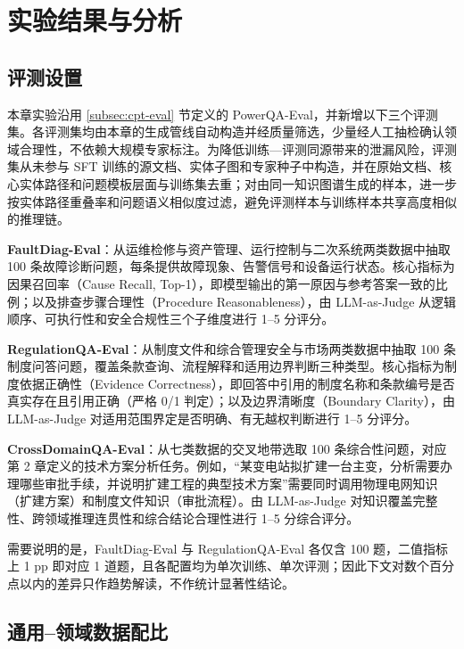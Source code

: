 \documentclass[fontset=fandol,type=master,campus=shenzhen,etitleauto=true]{hithesisbook}
\begin{document}
\section{实验结果与分析}\label{sft-ux8badux7ec3ux4e0eux5b9eux9a8cux7ed3ux679c}

\subsection{评测设置}\label{subsec:sft-eval}

本章实验沿用 \ref{subsec:cpt-eval} 节定义的 PowerQA-Eval，并新增以下三个评测集。各评测集均由本章的生成管线自动构造并经质量筛选，少量经人工抽检确认领域合理性，不依赖大规模专家标注。为降低训练—评测同源带来的泄漏风险，评测集从未参与 SFT 训练的源文档、实体子图和专家种子中构造，并在原始文档、核心实体路径和问题模板层面与训练集去重；对由同一知识图谱生成的样本，进一步按实体路径重叠率和问题语义相似度过滤，避免评测样本与训练样本共享高度相似的推理链。

\textbf{FaultDiag-Eval}：从运维检修与资产管理、运行控制与二次系统两类数据中抽取 100 条故障诊断问题，每条提供故障现象、告警信号和设备运行状态。核心指标为因果召回率（Cause Recall, Top-1），即模型输出的第一原因与参考答案一致的比例；以及排查步骤合理性（Procedure Reasonableness），由 LLM-as-Judge 从逻辑顺序、可执行性和安全合规性三个子维度进行 1--5 分评分。

\textbf{RegulationQA-Eval}：从制度文件和综合管理安全与市场两类数据中抽取 100 条制度问答问题，覆盖条款查询、流程解释和适用边界判断三种类型。核心指标为制度依据正确性（Evidence Correctness），即回答中引用的制度名称和条款编号是否真实存在且引用正确（严格 0/1 判定）；以及边界清晰度（Boundary Clarity），由 LLM-as-Judge 对适用范围界定是否明确、有无越权判断进行 1--5 分评分。

\textbf{CrossDomainQA-Eval}：从七类数据的交叉地带选取 100 条综合性问题，对应第 2 章定义的技术方案分析任务。例如，“某变电站拟扩建一台主变，分析需要办理哪些审批手续，并说明扩建工程的典型技术方案”需要同时调用物理电网知识（扩建方案）和制度文件知识（审批流程）。由 LLM-as-Judge 对知识覆盖完整性、跨领域推理连贯性和综合结论合理性进行 1--5 分综合评分。

需要说明的是，FaultDiag-Eval 与 RegulationQA-Eval 各仅含 100 题，二值指标上 1 pp 即对应 1 道题，且各配置均为单次训练、单次评测；因此下文对数个百分点以内的差异只作趋势解读，不作统计显著性结论。

\subsection{通用--领域数据配比}\label{subsec:sft-ratio}
\end{document}
